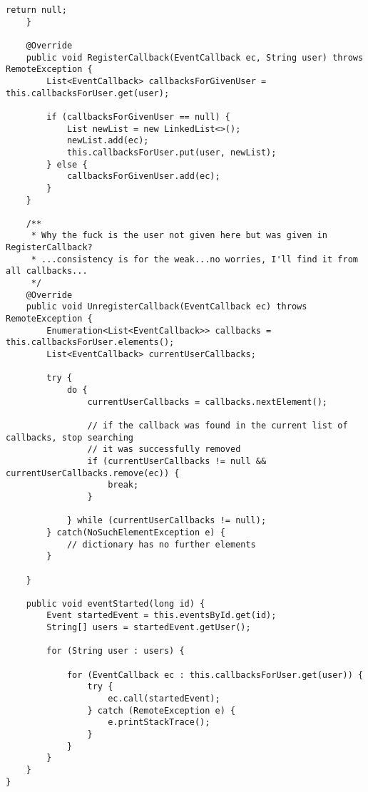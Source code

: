 \begin{lstlisting}[style=java]
        return null;
    }

    @Override
    public void RegisterCallback(EventCallback ec, String user) throws RemoteException {
        List<EventCallback> callbacksForGivenUser = this.callbacksForUser.get(user);

        if (callbacksForGivenUser == null) {
            List newList = new LinkedList<>();
            newList.add(ec);
            this.callbacksForUser.put(user, newList);
        } else {
            callbacksForGivenUser.add(ec);
        }
    }

    /**
     * Why the fuck is the user not given here but was given in RegisterCallback?
     * ...consistency is for the weak...no worries, I'll find it from all callbacks...
     */
    @Override
    public void UnregisterCallback(EventCallback ec) throws RemoteException {
        Enumeration<List<EventCallback>> callbacks = this.callbacksForUser.elements();
        List<EventCallback> currentUserCallbacks;

        try {
            do {
                currentUserCallbacks = callbacks.nextElement();

                // if the callback was found in the current list of callbacks, stop searching
                // it was successfully removed
                if (currentUserCallbacks != null && currentUserCallbacks.remove(ec)) {
                    break;
                }

            } while (currentUserCallbacks != null);
        } catch(NoSuchElementException e) {
            // dictionary has no further elements
        }

    }

    public void eventStarted(long id) {
        Event startedEvent = this.eventsById.get(id);
        String[] users = startedEvent.getUser();

        for (String user : users) {

            for (EventCallback ec : this.callbacksForUser.get(user)) {
                try {
                    ec.call(startedEvent);
                } catch (RemoteException e) {
                    e.printStackTrace();
                }
            }
        }
    }
}

\end{lstlisting}

